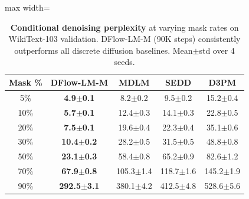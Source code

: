 
\providecommand{\tbd}[1]{#1}
\providecommand{\best}[1]{\textbf{#1}}
\providecommand{\secondbest}[1]{\underline{#1}}

\begin{table}[t]
\centering
\caption{\textbf{Conditional denoising perplexity} at varying mask rates on WikiText-103 validation. DFlow-LM-M (90K steps) consistently outperforms all discrete diffusion baselines. Mean$\pm$std over 4 seeds.}
\label{tab:conditional_ppl}
\vspace{4pt}
\begin{adjustbox}{max width=\columnwidth}
\begin{tabular}{@{}ccccc@{}}
\toprule
\textbf{Mask \%} & \textbf{DFlow-LM-M} & \textbf{MDLM} & \textbf{SEDD} & \textbf{D3PM} \\
\midrule
5\%   & \best{\tbd{4.9$\pm$0.1}}   & \tbd{8.2$\pm$0.2}   & \tbd{9.5$\pm$0.2}   & \tbd{15.2$\pm$0.4} \\
10\%  & \best{\tbd{5.7$\pm$0.1}}   & \tbd{12.4$\pm$0.3}  & \tbd{14.1$\pm$0.3}  & \tbd{22.8$\pm$0.5} \\
20\%  & \best{\tbd{7.5$\pm$0.1}}   & \tbd{19.6$\pm$0.4}  & \tbd{22.3$\pm$0.4}  & \tbd{35.1$\pm$0.6} \\
30\%  & \best{\tbd{10.4$\pm$0.2}}  & \tbd{28.2$\pm$0.5}  & \tbd{31.5$\pm$0.5}  & \tbd{48.8$\pm$0.8} \\
50\%  & \best{\tbd{23.1$\pm$0.3}}  & \tbd{58.4$\pm$0.8}  & \tbd{65.2$\pm$0.9}  & \tbd{82.6$\pm$1.2} \\
70\%  & \best{\tbd{67.9$\pm$0.8}}  & \tbd{105.3$\pm$1.4} & \tbd{118.7$\pm$1.6} & \tbd{145.2$\pm$1.9} \\
90\%  & \best{\tbd{292.5$\pm$3.1}} & \tbd{380.1$\pm$4.2} & \tbd{412.5$\pm$4.8} & \tbd{528.6$\pm$5.6} \\
\bottomrule
\end{tabular}
\end{adjustbox}
\end{table}


